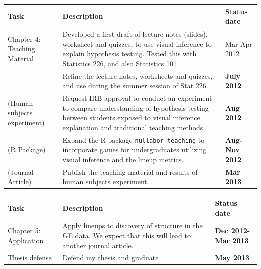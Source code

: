 \documentclass{beamer}
\begin{document}
\begin{frame}
\vspace{-0.5cm}
\begin{table}[hbtp]
\small
\centering 
\begin{tabular}{|p{2.5cm}|p{6cm}|l|} 
\hline
Task &  Description & Status date\\ %
\hline
Chapter 4: Teaching Material & Developed a first draft of lecture notes (slides), worksheet and quizzes, to use visual inference to explain hypothesis testing. Tested this with Statistics 226, and also Statistics 101 & Mar-Apr 2012 \\
 & Refine the lecture notes, worksheets and quizzes, and use during the summer session of Stat 226. & {\bf July 2012} \\
 (Human subjects experiment) & Request IRB approval to conduct an experiment to compare understanding of hypothesis testing between students exposed to visual inference explanation and traditional teaching methods. & {\bf Aug 2012} \\
(R Package)  & Expand the R package {\tt nullabor-teaching} to incorporate games for undergraduates utilizing visual inference and the lineup metrics. & {\bf Aug-Nov 2012} \\
(Journal Article) & Publish the teaching material and results of human subjects experiment. & {\bf Mar 2013}\\\hline
\end{tabular}
\label{tbl:tjob}
\end{table}
\end{frame}

\begin{frame}
\begin{table}[hbtp]
\small
\centering 
\begin{tabular}{|p{2.5cm}|p{5cm}|l|} 
\hline
Task &  Description & Status date\\ %
\hline
Chapter 5: Application & Apply lineups to discovery of structure in the GE data. We expect that this will lead to another journal article. & {\bf Dec 2012-Mar 2013}\\ \hline
Thesis defense & Defend my thesis and graduate & {\bf May 2013}\\
\hline 
\end{tabular}
\label{tbl:tjob}
\end{table}
\end{frame}
\end{document}
